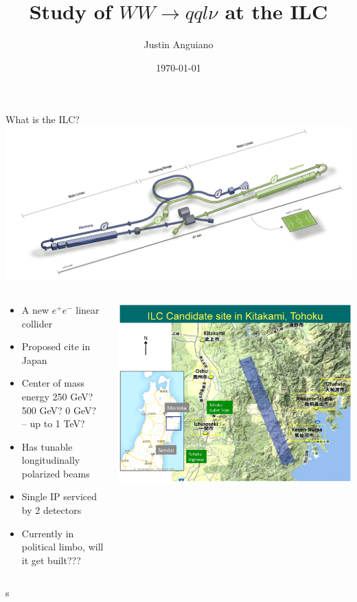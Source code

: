 \documentclass[10pt]{beamer}
\author{Justin Anguiano}
\title{Study of $WW\rightarrow qql\nu$ at the ILC}
\institute{University Of Kansas}
\date{\today}
\begin{document}
\maketitle


\begin{frame}
\tableofcontents
\end{frame}
\begin{frame}{What is the ILC?}
\includegraphics[scale=0.25]{ilcconcept.jpg}\\
\begin{columns}
\begin{column}{0.5\textwidth}
\begin{itemize}
\scriptsize
\item A new  $e^+ e^-$ linear collider 
\item Proposed cite in Japan 
\item Center of mass energy  250 GeV? 500 GeV? 0 GeV? -- up to 1 TeV?
\item Has tunable longitudinally polarized beams
\item Single IP serviced by 2 detectors
\item Currently in political limbo, will it get built???
\end{itemize}
\end{column}
\begin{column}{0.5\textwidth}
\includegraphics[scale=0.3]{ILC-Candidate-Area2.jpg}\\

\end{column}
\end{columns}s
\end{frame}
\end{document}
